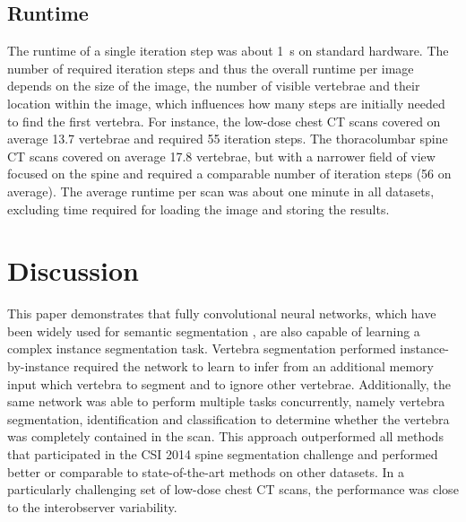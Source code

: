 \documentclass[authoryear,5p,final,times]{elsarticle}
\begin{document}
	\subsection{Runtime}
	
	The runtime of a single iteration step was about \SI{1}{\second} on standard hardware. The number of required iteration steps and thus the overall runtime per image depends on the size of the image, the number of visible vertebrae and their location within the image, which influences how many steps are initially needed to find the first vertebra. For instance, the low-dose chest CT scans covered on average \num{13.7} vertebrae and required \num{55} iteration steps. The thoracolumbar spine CT scans covered on average \num{17.8} vertebrae, but with a narrower field of view focused on the spine and required a comparable number of iteration steps (\num{56} on average). The average runtime per scan was about one minute in all datasets, excluding time required for loading the image and storing the results.
    
    \section{Discussion}
    
    This paper demonstrates that fully convolutional neural networks, which have been widely used for semantic segmentation \citep{Litjens2017}, are also capable of learning a complex instance segmentation task. Vertebra segmentation performed instance-by-instance required the network to learn to infer from an additional memory input which vertebra to segment and to ignore other vertebrae. Additionally, the same network was able to perform multiple tasks concurrently, namely vertebra segmentation, identification and classification to determine whether the vertebra was completely contained in the scan. This approach outperformed all methods that participated in the CSI 2014 spine segmentation challenge \citep{Yao2016} and performed better or comparable to state-of-the-art methods on other datasets. In a particularly challenging set of low-dose chest CT scans, the performance was close to the interobserver variability.
    
\end{document}

